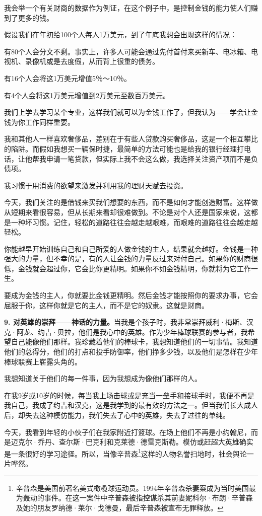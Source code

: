 我会举一个有关财商的数据作为例证，在这个例子中，是控制金钱的能力使人们赚到了更多的钱。

假设我们在年初给100个人每人1万美元，到了年底我想会出现这样的情况：

{\kaishu
有80个人会分文不剩。事实上，许多人可能会通过先付首付来买新车、电冰箱、电视机、录像机或是去度假，从而背上很重的债务。

有16个人会将这1万美元增值5％～10％。

有4个人会将这1万美元增值到2万美元至数百万美元。
}

我们上学去学习某个专业，这样我们就可以为金钱工作了，但我认为——学会让金钱为你工作同样重要。

我和其他人一样喜欢奢侈品，差别在于有些人贷款购买奢侈品，这是一个相互攀比的陷阱。而假如我想买一辆保时捷，最简单的方法可能也是给我的银行经理打电话，让他帮我申请一笔贷款，但实际上我不会这么做，我选择关注资产项而不是负债项。

我习惯于用消费的欲望来激发并利用我的理财天赋去投资。

今天，我们关注的是借钱来买我们想要的东西，而不是如何才能创造财富。这样做从短期来看很容易，但从长期来看却很难做到。不论是对个人还是国家来说，这都是一种坏习惯。记住，轻松的道路往往会越走越艰难，而艰难的道路往往会越走越轻松。

你能越早开始训练自己和自己所爱的人做金钱的主人，结果就会越好。金钱是一种强大的力量，但不幸的是，有的人让金钱的力量反过来对付自己。如果你的财商很低，金钱就会超过你，它会比你更精明。如果你不如金钱精明，你就将为它工作一生。

要成为金钱的主人，你就要比金钱更精明。然后金钱才能按照你的要求办事，它会屈服于你，这样你就是它的主人，而不是它的奴隶。这就是财商。

\textbf{9. 对英雄的崇拜——神话的力量。}当我是个孩子时，我非常崇拜威利·梅斯、汉克·阿龙、约吉·贝拉，他们是我心中的英雄。作为少年棒球联赛的参与者，我希望自己能像他们那样。我珍藏着他们的棒球卡，我想知道他们的一切事情。我知道他们的总得分，他们的打点和投手防御率，他们挣多少钱，以及他们是怎样在少年棒球联赛上崭露头角的。

我想知道关于他们的每一件事，因为我想成为像他们那样的人。

在我9岁或10岁的时候，每当我上场击球或是充当一垒手和接球手时，我便不再是我自己，我成了约吉和汉克，这是我学到的最有效的方法之一。但当我们长大成人后，却失去这种模仿能力，我们失去了心中的英雄，失去了过往的单纯。

今天，我看到年轻的小伙子们在我家附近打篮球。在场上他们不再是小约翰尼，而是迈克尔·乔丹、查尔斯·巴克利和克莱德·德雷克斯勒。模仿或赶超大英雄确实是一条很好的学习途径。所以，当像辛普森\footnote{辛普森是美国前著名美式橄榄球运动员。1994年辛普森杀妻案成为当时美国最为轰动的事件。在这一案件中辛普森被指控谋杀其前妻妮科尔·布朗·辛普森及她的朋友罗纳德·莱尔·戈德曼，最后辛普森被宣布无罪释放。}这样的人物名誉扫地时，社会舆论一片哗然。

